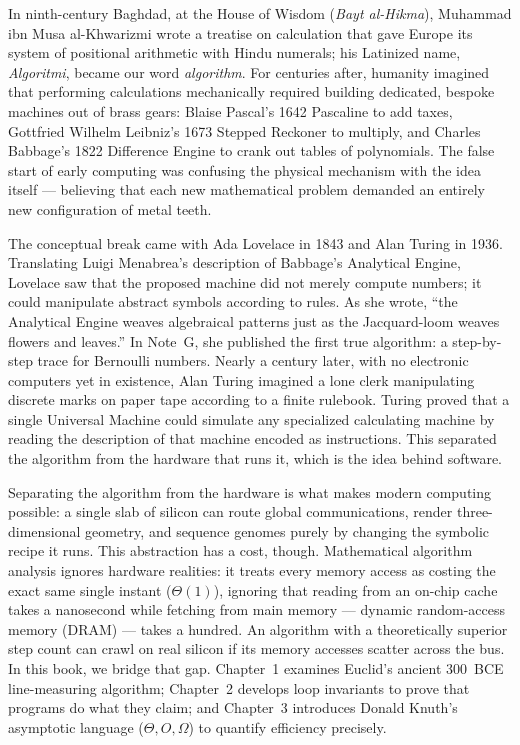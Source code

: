 \begin{historybox}
In ninth-century Baghdad, at the House of Wisdom (\emph{Bayt al-Hikma}), Muhammad ibn Musa
al-Khwarizmi wrote a treatise on calculation that gave Europe its system of positional arithmetic
with Hindu numerals; his Latinized name, \emph{Algoritmi}, became our word \emph{algorithm}. For
centuries after, humanity imagined that performing calculations mechanically required building
dedicated, bespoke machines out of brass gears: Blaise Pascal's 1642 Pascaline to add taxes,
Gottfried Wilhelm Leibniz's 1673 Stepped Reckoner to multiply, and Charles Babbage's 1822 Difference
Engine to crank out tables of polynomials. The false start of early computing was confusing the
physical mechanism with the idea itself --- believing that each new mathematical problem demanded
an entirely new configuration of metal teeth.

The conceptual break came with Ada Lovelace in 1843 and Alan Turing in 1936. Translating Luigi
Menabrea's description of Babbage's Analytical Engine, Lovelace saw that the proposed machine did
not merely compute numbers; it could manipulate abstract symbols according to rules. As she wrote,
``the Analytical Engine weaves algebraical patterns just as the Jacquard-loom weaves flowers and
leaves.'' In Note~G, she published the first true algorithm: a step-by-step trace for
Bernoulli numbers. Nearly a century later, with no electronic computers yet in existence, Alan
Turing imagined a lone clerk manipulating discrete marks on paper tape according to a finite
rulebook. Turing proved that a single Universal Machine could simulate any specialized calculating
machine by reading the description of that machine encoded as instructions. This separated
the algorithm from the hardware that runs it, which is the idea behind software.

Separating the algorithm from the hardware is what makes modern computing possible: a single slab of
silicon can route global communications, render three-dimensional geometry, and sequence genomes
purely by changing the symbolic recipe it runs. This abstraction has a cost, though.
Mathematical algorithm analysis ignores hardware realities: it treats every memory access as
costing the exact same single instant ($\Theta(1)$), ignoring that reading from an on-chip cache
takes a nanosecond while fetching from main memory --- dynamic random-access memory (DRAM) --- takes a hundred. An algorithm with a
theoretically superior step count can crawl on real silicon if its memory accesses scatter across
the bus. In this book, we bridge that gap. Chapter~1 examines Euclid's ancient 300~BCE line-measuring
algorithm; Chapter~2 develops loop invariants to prove that programs do what they claim; and
Chapter~3 introduces Donald Knuth's asymptotic language ($\Theta, O, \Omega$) to quantify efficiency
precisely.
\end{historybox}

